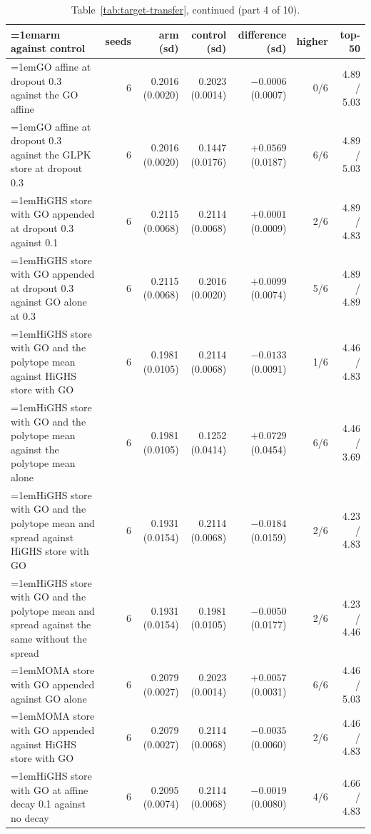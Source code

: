 \begin{table}[H]
  \centering
  \footnotesize
  \setlength{\tabcolsep}{2.5pt}
  \caption[The rounds on betaxanthin: arm against control, continued]{Table~\ref{tab:target-transfer}, continued (part 4 of 10).}
  \label{tab:target-transfer-4}
  \begin{tabular}{@{}>{\raggedright\hangindent=1em\hangafter=1\arraybackslash}p{78.5mm}rrrrrr@{}}
    \hline
    arm against control & seeds & arm (sd) & control (sd) & difference (sd) & higher & top-50 \\
    \hline
    GO affine at dropout 0.3 against the GO affine & 6 & 0.2016 (0.0020) & 0.2023 (0.0014) & $-0.0006$ (0.0007) & 0/6 & 4.89 / 5.03 \\
    GO affine at dropout 0.3 against the GLPK store at dropout 0.3 & 6 & 0.2016 (0.0020) & 0.1447 (0.0176) & $+0.0569$ (0.0187) & 6/6 & 4.89 / 5.03 \\
    HiGHS store with GO appended at dropout 0.3 against 0.1 & 6 & 0.2115 (0.0068) & 0.2114 (0.0068) & $+0.0001$ (0.0009) & 2/6 & 4.89 / 4.83 \\
    HiGHS store with GO appended at dropout 0.3 against GO alone at 0.3 & 6 & 0.2115 (0.0068) & 0.2016 (0.0020) & $+0.0099$ (0.0074) & 5/6 & 4.89 / 4.89 \\
    HiGHS store with GO and the polytope mean against HiGHS store with GO & 6 & 0.1981 (0.0105) & 0.2114 (0.0068) & $-0.0133$ (0.0091) & 1/6 & 4.46 / 4.83 \\
    HiGHS store with GO and the polytope mean against the polytope mean alone & 6 & 0.1981 (0.0105) & 0.1252 (0.0414) & $+0.0729$ (0.0454) & 6/6 & 4.46 / 3.69 \\
    HiGHS store with GO and the polytope mean and spread against HiGHS store with GO & 6 & 0.1931 (0.0154) & 0.2114 (0.0068) & $-0.0184$ (0.0159) & 2/6 & 4.23 / 4.83 \\
    HiGHS store with GO and the polytope mean and spread against the same without the spread & 6 & 0.1931 (0.0154) & 0.1981 (0.0105) & $-0.0050$ (0.0177) & 2/6 & 4.23 / 4.46 \\
    MOMA store with GO appended against GO alone & 6 & 0.2079 (0.0027) & 0.2023 (0.0014) & $+0.0057$ (0.0031) & 6/6 & 4.46 / 5.03 \\
    MOMA store with GO appended against HiGHS store with GO & 6 & 0.2079 (0.0027) & 0.2114 (0.0068) & $-0.0035$ (0.0060) & 2/6 & 4.46 / 4.83 \\
    HiGHS store with GO at affine decay 0.1 against no decay & 6 & 0.2095 (0.0074) & 0.2114 (0.0068) & $-0.0019$ (0.0080) & 4/6 & 4.66 / 4.83 \\

\end{tabular}
\end{table}
